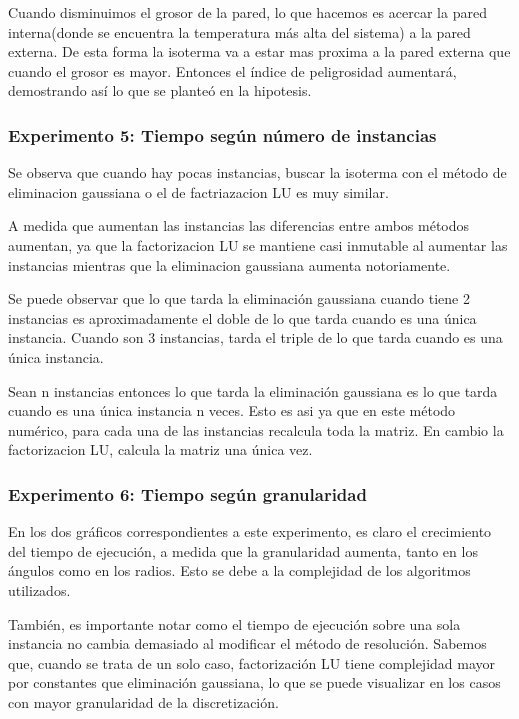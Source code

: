 {	Cuando disminuimos el grosor de la pared, lo que hacemos es acercar la pared interna(donde se encuentra la temperatura más alta del sistema) a la pared externa. De esta forma la isoterma va a estar mas proxima a la pared externa que cuando el grosor es mayor. Entonces el índice de peligrosidad aumentará, demostrando así lo que se planteó en la hipotesis.
	

\subsubsection*{Experimento 5: Tiempo según número de instancias}
	Se observa que cuando hay pocas instancias, buscar la isoterma con el método de eliminacion gaussiana o el de factriazacion LU es muy similar.

	A medida que aumentan las instancias las diferencias entre ambos métodos aumentan, ya que la factorizacion LU se mantiene casi inmutable al aumentar las instancias mientras que la eliminacion gaussiana aumenta notoriamente.

	Se puede observar que lo que tarda la eliminación gaussiana cuando tiene 2 instancias es aproximadamente el doble de lo que tarda cuando es una única instancia. Cuando son 3 instancias, tarda el triple de lo que tarda cuando es una única instancia. 

	Sean n instancias entonces lo que tarda la eliminación gaussiana es lo que tarda cuando es una única instancia n veces. Esto es asi ya que en este método numérico, para cada una de las instancias recalcula toda la matriz. En cambio la factorizacion LU, calcula la matriz una única vez.


\subsubsection*{Experimento 6: Tiempo según granularidad}
  	En los dos gráficos correspondientes a este experimento, es claro el crecimiento del tiempo de ejecución, a medida que la granularidad aumenta, tanto en los ángulos como en los radios. Esto se debe a la complejidad de los algoritmos utilizados.

  	También, es importante notar como el tiempo de ejecución sobre una sola instancia no cambia demasiado al modificar el método de resolución. Sabemos que, cuando se trata de un solo caso, factorización LU tiene complejidad mayor por constantes que eliminación gaussiana, lo que se puede visualizar en los casos con mayor granularidad de la discretización.


}
